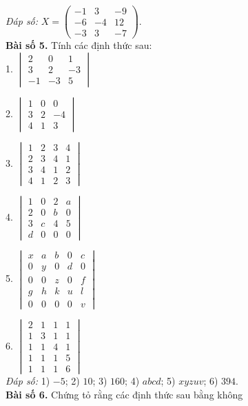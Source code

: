 \textit{Đáp số:} \(X = \begin{pmatrix}
-1 & 3 & -9 \\
-6 & -4 & 12 \\
-3 & 3 & -7
\end{pmatrix}\).\\
\textbf{Bài số 5.} Tính các định thức sau:\\

1. \(\begin{vmatrix}
2 & 0 & 1 \\
3 & 2 & -3 \\
-1 & -3 & 5
\end{vmatrix}\)\\
\vspace*{0.5cm}

2. \(\begin{vmatrix}
1 & 0 & 0 \\
3 & 2 & -4 \\
4 & 1 & 3
\end{vmatrix}\)\\
\vspace*{0.5cm}

3. \(\begin{vmatrix}
1 & 2 & 3 & 4 \\
2 & 3 & 4 & 1 \\
3 & 4 & 1 & 2 \\
4 & 1 & 2 & 3
\end{vmatrix}\)\\
\vspace*{0.5cm}

4. \(\begin{vmatrix}
1 & 0 & 2 & a \\
2 & 0 & b & 0 \\
3 & c & 4 & 5 \\
d & 0 & 0 & 0
\end{vmatrix}\)\\
\vspace*{0.5cm}

5. \(\begin{vmatrix}
x & a & b & 0 & c \\
0 & y & 0 & d & 0 \\
0 & 0 & z & 0 & f \\
g & h & k & u & l \\
0 & 0 & 0 & 0 & v
\end{vmatrix}\)
\vspace*{0.5cm}

6. \(\begin{vmatrix}
2 & 1 & 1 & 1 \\
1 & 3 & 1 & 1 \\
1 & 1 & 4 & 1 \\
1 & 1 & 1 & 5 \\
1 & 1 & 1 & 6
\end{vmatrix}\)\\
\vspace*{0.5cm}
\textit{Đáp số:}
1) \(-5\);
2) \(10\);
3) \(160\);
4) \(abcd\);
5) \(xyzuv\);
6) \(394\).\\
\textbf{Bài số 6.} Chứng tỏ rằng các định thức sau bằng không

